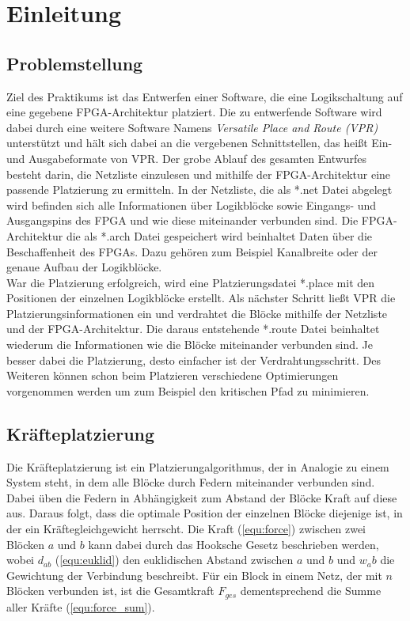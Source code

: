 \chapter{Einleitung}

    \section{Problemstellung}
        Ziel des Praktikums ist das Entwerfen einer Software, die eine Logikschaltung auf eine gegebene FPGA-Architektur platziert.
        Die zu entwerfende Software wird dabei durch eine weitere Software Namens \textit{Versatile Place and Route (VPR)} unterstützt und hält sich dabei an die vergebenen Schnittstellen,
        das heißt Ein- und Ausgabeformate von VPR.
        Der grobe Ablauf des gesamten Entwurfes besteht darin, die Netzliste einzulesen und
        mithilfe der FPGA-Architektur eine passende Platzierung zu ermitteln.
        In der Netzliste, die als *.net Datei abgelegt wird befinden sich alle Informationen über
        Logikblöcke sowie Eingangs- und Ausgangspins des FPGA und wie diese miteinander verbunden sind.
        Die FPGA-Architektur die als *.arch Datei gespeichert wird beinhaltet Daten über die Beschaffenheit des FPGAs.
        Dazu gehören zum Beispiel Kanalbreite oder der genaue Aufbau der Logikblöcke.
        \\
        War die Platzierung erfolgreich, wird eine Platzierungsdatei *.place mit den Positionen der einzelnen Logikblöcke erstellt.
        Als nächster Schritt ließt VPR die Platzierungsinformationen ein und verdrahtet die Blöcke mithilfe der Netzliste und der FPGA-Architektur.
        Die daraus entstehende *.route Datei beinhaltet wiederum die Informationen wie die Blöcke miteinander verbunden sind.
        Je besser dabei die Platzierung, desto einfacher ist der Verdrahtungsschritt.
        Des Weiteren können schon beim Platzieren verschiedene Optimierungen vorgenommen werden um zum Beispiel den kritischen Pfad zu minimieren.

    \section{Kräfteplatzierung}
        Die Kräfteplatzierung ist ein Platzierungalgorithmus, der in Analogie zu einem System steht, in dem alle Blöcke durch Federn miteinander verbunden sind.
        Dabei üben die Federn in Abhängigkeit zum Abstand der Blöcke Kraft auf diese aus.
        Daraus folgt, dass die optimale Position der einzelnen Blöcke diejenige ist, in der ein Kräftegleichgewicht herrscht.
        Die Kraft (\ref{equ:force}) zwischen zwei Blöcken $a$ und $b$ kann dabei durch das Hooksche Gesetz beschrieben werden, wobei $d_{ab}$ (\ref{equ:euklid}) den euklidischen Abstand zwischen $a$ und $b$
        und $w_ab$ die Gewichtung der Verbindung beschreibt. Für ein Block in einem Netz, der mit $n$ Blöcken verbunden ist,
        ist die Gesamtkraft $F_{ges}$ dementsprechend die Summe aller Kräfte (\ref{equ:force_sum}).


